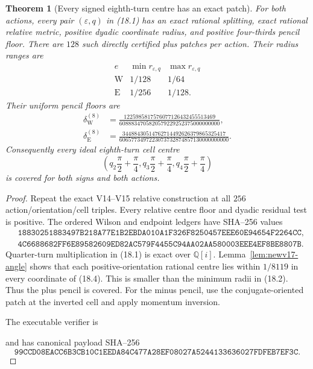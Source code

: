 \documentclass[11pt,oneside]{article}
\newtheorem{theorem}{Theorem}[section]
\theoremstyle{definition}
\theoremstyle{remark}
\begin{document}
\begin{theorem}[Every signed eighth-turn centre has an exact patch]
\label{thm:newv18-eighth-atlas}
For both actions, every pair \((\varepsilon,q)\) in (18.1) has an
exact rational splitting, exact rational relative metric, positive
dyadic coordinate radius, and positive four-thirds pencil floor.
There are \(128\) such directly certified plus patches per action.
Their radius ranges are
\[
\begin{array}{c|cc}
e&\min r_{\varepsilon,q}&\max r_{\varepsilon,q}\\ \hline
\mathrm W&1/128&1/64\\
\mathrm E&1/256&1/128.
\end{array}                                               \tag{18.2}
\]
Their uniform pencil floors are
\[
\begin{aligned}
 \delta_{\mathrm W}^{(8)}
 &=
 \frac{1225985817576077126432455513469}
 {6088834705820579229252375000000000},\\
 \delta_{\mathrm E}^{(8)}
 &=
 \frac{34488430514762714492626379865325417}
 {6065773497223073732874857130000000000}.
\end{aligned}                                             \tag{18.3}
\]
Consequently every ideal eighth-turn cell centre
\[
 \left(q_2\frac{\pi}{2}+\frac{\pi}{4},
       q_3\frac{\pi}{2}+\frac{\pi}{4},
       q_4\frac{\pi}{2}+\frac{\pi}{4}\right)              \tag{18.4}
\]
is covered for both signs and both actions.
\end{theorem}

\begin{proof}
Repeat the exact V14--V15 relative construction at all \(256\)
action/orientation/cell triples.  Every relative centre floor and
dyadic residual test is positive.  The ordered Wilson and endpoint
ledgers have SHA--256 values
\[
\begin{aligned}
&\texttt{18830251883497B218A77E1B2EBDA010A1F326F8250457EEE60E94654F2264CC},\\
&\texttt{4C6688682FF6E89582609ED82AC579F4455C94AA02AA580003EEE4EF8BE8807B}.
\end{aligned}                                             \tag{18.5}
\]
Quarter-turn multiplication in (18.1) is exact over
\(\mathbb Q[i]\).  Lemma~\ref{lem:newv17-angle} shows that each
positive-orientation rational centre lies within \(1/8119\) in every
coordinate of (18.4).  This is smaller than the minimum radii in
(18.2).  Thus the plus pencil is covered.  For the minus pencil, use
the conjugate-oriented patch at the inverted cell and apply momentum
inversion.

The executable verifier is
\begin{center}
\footnotesize
{}
\end{center}
and has canonical payload SHA--256
\[
\texttt{99CCD08EACC6B3CB10C1EEDA84C477A28EF08027A5244133636027FDFEB7EF3C}.
                                                               \tag{18.6}
\]
\end{proof}
\end{document}
